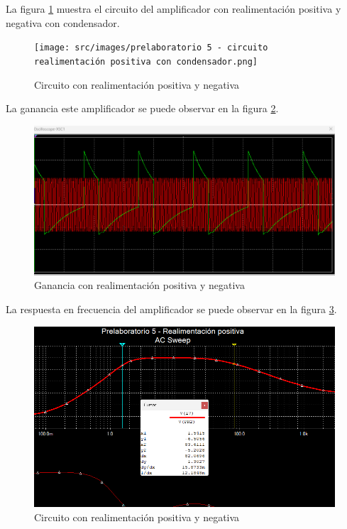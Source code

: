 \documentclass{article}
\begin{document}

La figura \ref{fig:circuito-amplificador-realimentacion-positiva-y-negativa} muestra el circuito del amplificador con realimentación positiva y negativa con condensador.

\begin{figure}[ht]
    \centering
    \texttt{[image: src/images/prelaboratorio 5 - circuito realimentación positiva con condensador.png]}
    \caption{Circuito con realimentación positiva y negativa} 
    \label{fig:circuito-amplificador-realimentacion-positiva-y-negativa}
\end{figure}

La ganancia este amplificador se puede observar en la figura \ref{fig:ganancia-amplificador-realimentacion-positiva-y-negativa}.
\begin{figure}[ht]
    \centering
    \includegraphics[width=\textwidth]{src/images/Prelaboratorio 5 - Ganancia realimentacion positiva con condensador.png}
    \caption{Ganancia con realimentación positiva y negativa} 
    \label{fig:ganancia-amplificador-realimentacion-positiva-y-negativa}
\end{figure}

La respuesta en frecuencia del amplificador se puede observar en la figura \ref{fig:respuesta-amplificador-realimentacion-positiva-y-negativa}.

\begin{figure}[ht]
    \centering
    \includegraphics[width=\textwidth]{src/images/Prelaboratorio 5 - Respuesta en frecuencia - realimentacion positiva con condensador.png}
    \caption{Circuito con realimentación positiva y negativa} 
    \label{fig:respuesta-amplificador-realimentacion-positiva-y-negativa}
\end{figure}
\end{document}
